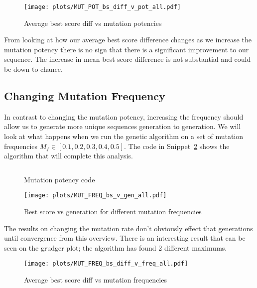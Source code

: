 \begin{figure}[h]
    \texttt{[image: plots/MUT\_POT\_bs\_diff\_v\_pot\_all.pdf]}
    \caption{Average best score diff vs mutation potencies}\label{fig:MUT-POT-bs-diff-v-pot-all}
\end{figure}

From looking at how our average best score difference changes as we increase the mutation potency there is no sign that there is a significant improvement to our sequence.
The increase in mean best score difference is not substantial and could be down to chance.

\subsection{Changing Mutation Frequency}\label{subsec:changingMutationFrequency}
In contrast to changing the mutation potency, increasing the frequency should allow us to generate more unique sequences generation to generation.
We will look at what happens when we run the genetic algorithm on a set of mutation frequencies \(M_f \in [0.1,0.2,0.3,0.4,0.5]\).
The code in Snippet~\ref{code:mutationFrequencyChecker} shows the algorithm that will complete this analysis.\\

\begin{figure}
    \inputminted{python}{code_snippets/mutationFrequencyChecker.py}
    \caption{Mutation potency code}\label{code:mutationFrequencyChecker}
\end{figure}

\begin{figure}[h]
    \texttt{[image: plots/MUT\_FREQ\_bs\_v\_gen\_all.pdf]}
    \caption{Best score vs generation for different mutation frequencies}\label{fig:MUT-FREQ-bs-v-gen-all}
\end{figure}

The results on changing the mutation rate don't obviously effect that generations until convergence from this overview.
There is an interesting result that can be seen on the grudger plot;
the algorithm has found 2 different maximums.

\begin{figure}[h]
    \texttt{[image: plots/MUT\_FREQ\_bs\_diff\_v\_freq\_all.pdf]}
    \caption{Average best score diff vs mutation frequencies}\label{fig:MUT-FREQ-bs-diff-v-freq-all}
\end{figure}

